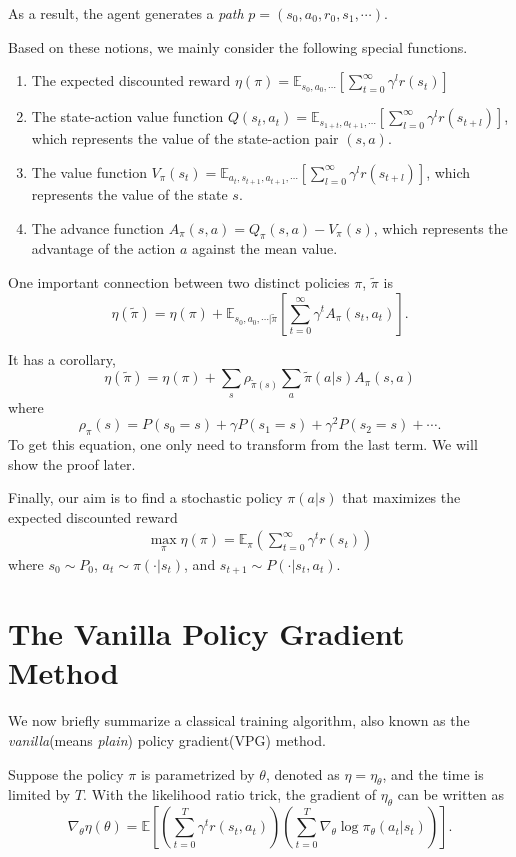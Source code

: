 As a result, the agent generates a \emph{path} $p=(s_0,a_0,r_0,s_1,\cdots)$.

Based on these notions, we mainly consider the following special functions.
\begin{enumerate}
\item
The expected discounted reward $\eta(\pi)=\mathbb{E}_{s_0, a_0, \cdots}\left[\sum_{t=0}^\infty \gamma^l r(s_t)\right]$
\item
The state-action value function $Q(s_t,a_t)=\mathbb{E}_{s_{1+t},a_{t+1},\cdots}[\sum_{l=0}^\infty\gamma^lr(s_{t+l})]$, which represents the value of the state-action pair $(s,a)$.
\item
The value function $V_{\pi}(s_t)=\mathbb{E}_{a_t,s_{t+1},a_{t+1},\cdots}[\sum_{l=0}^\infty\gamma^lr(s_{t+l})]$, which represents the value of the state $s$.
\item
The advance function $A_\pi(s,a)=Q_{\pi}(s,a)-V_\pi(s)$, which represents the advantage of the action $a$ against the mean value.
\end{enumerate}

One important connection between two distinct policies $\pi$, $\tilde\pi$ is
$$\eta(\tilde\pi)=\eta(\pi)+\mathbb{E}_{s_0,a_0,\cdots|\tilde\pi}[\sum_{t=0}^\infty\gamma^tA_\pi(s_t,a_t)].$$

It has a corollary,
$$ \eta(\tilde\pi)=\eta(\pi)+\sum_s\rho_{\tilde\pi(s)}\sum_a\tilde\pi(a|s)A_{\pi}(s,a)
$$
where
$$ \rho_\pi(s)=P(s_0=s)+\gamma P(s_1=s)+\gamma^2P(s_2=s)+\cdots.
$$
To get this equation, one only need to transform from the last term. We will show the proof later.

Finally, our aim is to find a stochastic policy $\pi(a|s)$ that maximizes the expected discounted reward 
\begin{align*}
\max_{\pi}\eta(\pi)=\mathbb{E}_{\pi}(\sum_{t=0}^{\infty}\gamma^{t}r(s_{t}))
\end{align*}
where $s_{0}\sim P_{0}$, $a_{t}\sim \pi(\cdot|s_{t})$, and $s_{t+1}\sim P(\cdot|s_{t},a_{t})$.

\section{The Vanilla Policy Gradient Method}
We  now briefly summarize a classical training algorithm, also known as the \emph{vanilla}(means \emph{plain}) policy gradient(VPG) method.

Suppose the policy $\pi$ is parametrized by $\theta$, denoted as $\eta=\eta_{\theta}$, and the time is limited by $T$. With the likelihood ratio trick, the gradient of $\eta_{\theta}$ can be written as
\[\nabla_{\theta}\eta(\theta)=\mathbb{E}\left[ \left(\sum_{t=0}^T \gamma^tr(s_t,a_t)\right)\left(\sum_{t=0}^T \nabla_{\theta}\log\pi_{\theta}(a_t|s_t)\right)  \right].\]

